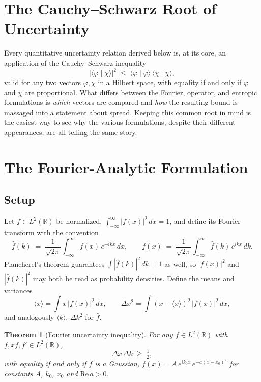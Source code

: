 \documentclass[11pt]{article}
\theoremstyle{plain}
\newtheorem{theorem}{Theorem}[section]
\theoremstyle{definition}
\theoremstyle{remark}
\begin{document}
\section{The Cauchy--Schwarz Root of Uncertainty}

Every quantitative uncertainty relation derived below is, at its core, an application of the
Cauchy--Schwarz inequality
\[
|\langle \varphi \mid \chi \rangle|^2 \;\leq\; \langle \varphi \mid \varphi \rangle\,
\langle \chi \mid \chi \rangle ,
\]
valid for any two vectors $\varphi,\chi$ in a Hilbert space, with equality if and only if $\varphi$
and $\chi$ are proportional. What differs between the Fourier, operator, and entropic
formulations is \emph{which} vectors are compared and \emph{how} the resulting bound is massaged
into a statement about spread. Keeping this common root in mind is the easiest way to see why the
various formulations, despite their different appearances, are all telling the same story.

\section{The Fourier-Analytic Formulation}

\subsection{Setup}

Let $f\in L^2(\mathbb{R})$ be normalized, $\int_{-\infty}^{\infty}|f(x)|^2\,dx = 1$, and define its
Fourier transform with the convention
\[
\hat f(k) \;=\; \frac{1}{\sqrt{2\pi}}\int_{-\infty}^{\infty} f(x)\, e^{-ikx}\, dx ,
\qquad
f(x) \;=\; \frac{1}{\sqrt{2\pi}}\int_{-\infty}^{\infty} \hat f(k)\, e^{ikx}\, dk .
\]
Plancherel's theorem guarantees $\int |\hat f(k)|^2\,dk = 1$ as well, so $|f(x)|^2$ and
$|\hat f(k)|^2$ may both be read as probability densities. Define the means and variances
\[
\langle x\rangle = \int x\,|f(x)|^2\,dx, \qquad
\Delta x^2 = \int (x-\langle x\rangle)^2\,|f(x)|^2\,dx ,
\]
and analogously $\langle k\rangle$, $\Delta k^2$ for $\hat f$.

\begin{theorem}[Fourier uncertainty inequality]
For any $f \in L^2(\mathbb{R})$ with $f, xf, f' \in L^2(\mathbb{R})$,
\[
\Delta x \, \Delta k \;\geq\; \tfrac12 ,
\]
with equality if and only if $f$ is a Gaussian, $f(x) = A\, e^{i k_0 x}\, e^{-a(x-x_0)^2}$ for
constants $A$, $k_0$, $x_0$ and $\mathrm{Re}\,a>0$.
\end{theorem}
\end{document}
